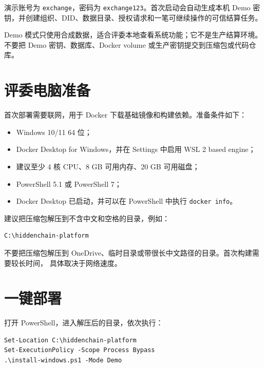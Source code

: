 \documentclass[UTF8,a4paper,zihao=-4,oneside]{ctexart}
\begin{document}
\begin{center}
\end{center}

演示账号为 \texttt{exchange}，密码为 \texttt{exchange123}。首次启动会自动生成本机 Demo
密钥，并创建组织、DID、数据目录、授权请求和一笔可继续操作的可信结算任务。

\begin{warningbox}
  Demo 模式只使用合成数据，适合评委本地查看系统功能；它不是生产结算环境。
  不要把 Demo 密钥、数据库、Docker volume 或生产密钥提交到压缩包或代码仓库。
\end{warningbox}

\section{评委电脑准备}

首次部署需要联网，用于 Docker 下载基础镜像和构建依赖。准备条件如下：

\begin{itemize}
  \item Windows 10/11 64 位；
  \item Docker Desktop for Windows，并在 Settings 中启用 WSL 2 based engine；
  \item 建议至少 4 核 CPU、8 GB 可用内存、20 GB 可用磁盘；
  \item PowerShell 5.1 或 PowerShell 7；
  \item Docker Desktop 已启动，并可以在 PowerShell 中执行 \texttt{docker info}。
\end{itemize}

建议把压缩包解压到不含中文和空格的目录，例如：

\begin{lstlisting}
C:\hiddenchain-platform
\end{lstlisting}

不要把压缩包解压到 OneDrive、临时目录或带很长中文路径的目录。首次构建需要较长时间，
具体取决于网络速度。

\section{一键部署}

打开 PowerShell，进入解压后的目录，依次执行：

\begin{lstlisting}
Set-Location C:\hiddenchain-platform
Set-ExecutionPolicy -Scope Process Bypass
.\install-windows.ps1 -Mode Demo
\end{lstlisting}
\end{document}
